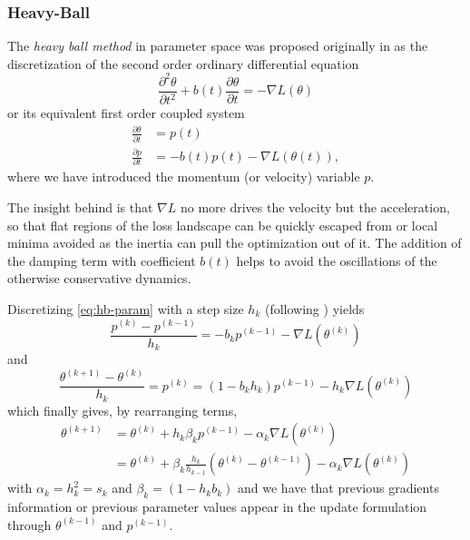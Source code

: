 \documentclass{article}
\theoremstyle{noparens}
\newcommand{\paramk}{\theta^{(k)}}
\newcommand{\paramkm}{\theta^{(k-1)}}
\newcommand{\paramkp}{\theta^{(k+1)}}
\newcommand{\pk}{p^{(k)}}
\newcommand{\pkm}{p^{(k-1)}}
\newcommand{\GradP}{\nabla}
\newcommand{\LossGrad}{\GradP L}
\begin{document}
\subsubsection{Heavy-Ball}
The \textit{heavy ball method} in parameter space was proposed originally in \cite{polyakMethodsSpeedingConvergence1964} as the discretization of the second order ordinary differential equation
\begin{equation}
\frac{\partial^2 \theta}{\partial t^2} + b(t) \frac{\partial \theta}{\partial t} = -\LossGrad(\theta)
\label{eq:hb-sos}
\end{equation}
or its equivalent first order coupled system
\begin{subequations}
    \begin{align}
\frac{\partial \theta}{\partial t} &= p(t) \label{eq:hb-vupdate}\\
\frac{\partial p}{\partial t} &= - b(t) p(t) - \LossGrad(\theta(t)), \label{eq:hb-fos}
\end{align}\label{eq:hb-param}
\end{subequations}
where we have introduced the momentum (or velocity) variable $p$.

The insight behind is that $\LossGrad$ no more drives the velocity but the acceleration, so that flat regions of the loss landscape can be quickly escaped from  or local minima avoided as the inertia can pull the optimization out of it. The addition of the damping term with coefficient $b(t)$ helps to avoid the oscillations of the otherwise conservative dynamics.

Discretizing \eqref{eq:hb-param}  with a step size $h_k$ (following \cite{attouchRavineMethodNesterov2022,attouchFirstorderOptimizationAlgorithms2020}) yields
$$
\frac{\pk-\pkm}{h_k} = - b_k \pkm -\LossGrad(\paramk)
$$
and
$$
\frac{\paramkp-\paramk}{h_k} = \pk = (1- b_kh_k) \pkm -h_k\LossGrad(\paramk)
$$
which finally gives, by rearranging terms,
\begin{subequations}
\begin{align}
\paramkp &= \paramk  + h_k\beta_k \pkm -\alpha_k \LossGrad(\paramk) \label{eq:hb-momentum-version}\\
 &= \paramk  + \beta_k \frac{h_k}{h_{k-1}}(\paramk - \paramkm) -\alpha_k\LossGrad(\paramk) \label{eq:hb-param-version}
\end{align}\label{eq:hb}
\end{subequations}
with $\alpha_k=h_k^2=s_k$ and $ \beta_k=(1-h_k b_k)$ and we have that previous gradients information  or previous parameter values appear in the update formulation through $\paramkm$  and $\pkm$.
\end{document}
